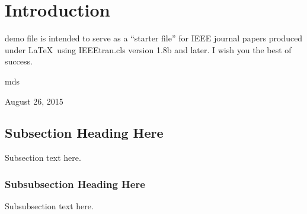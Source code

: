 \documentclass[journal]{IEEEtran}
\begin{document}
\section{Introduction}
% 
% 
% 
% 
 demo file is intended to serve as a ``starter file''
for IEEE journal papers produced under \LaTeX\ using
IEEEtran.cls version 1.8b and later.
I wish you the best of success.

\hfill mds
 
\hfill August 26, 2015

\subsection{Subsection Heading Here}
Subsection text here.


\subsubsection{Subsubsection Heading Here}
Subsubsection text here.


%
%
\end{document}
